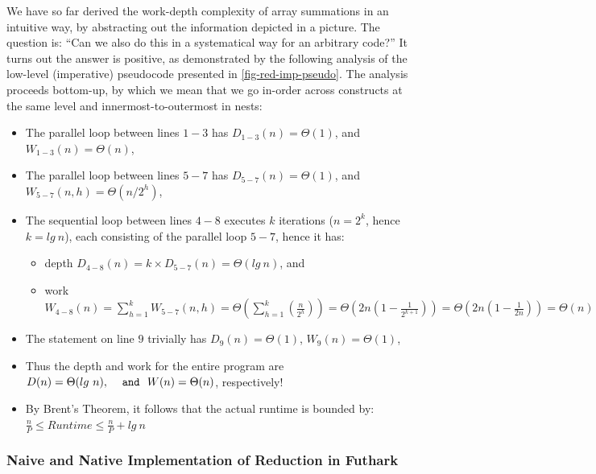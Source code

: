 \documentclass[acmsmall,review]{acmart}\settopmatter{printfolios=true,printccs=false,printacmref=false}
\begin{document}
We have so far derived the work-depth complexity of array summations
in an intuitive way, by abstracting out the information depicted in 
a picture.   The question is: ``Can we also do this in a systematical
way for an arbitrary code?'' It turns out the answer is positive,
as demonstrated by the following analysis of the low-level (imperative)
pseudocode presented in \cref{fig-red-imp-pseudo}. The analysis
proceeds bottom-up, by which we mean that we go in-order across
constructs at the same level and innermost-to-outermost in
nests:

\begin{itemize}
    \item The parallel loop between lines $1-3$ has 
            $D_{1-3}(n) = \Theta(1)$, and $W_{1-3}(n) = \Theta(n)$,
    \item The parallel loop between lines $5-7$ has
            $D_{5-7}(n) = \Theta(1)$, and $W_{5-7}(n,h) = \Theta(n/2^h)$,
    \item The sequential loop between lines $4-8$ executes $k$ 
            iterations ($n = 2^k$, hence $k = lg \ n$), each 
            consisting of the parallel loop $5-7$, 
            hence it has:
        \begin{itemize}
           \item depth $D_{4-8}(n) = k \times D_{5-7}(n) = \Theta(lg \ n)$, and
           \item work $W_{4-8}(n) = \sum_{h=1}^k W_{5-7}(n,h) = \Theta(\sum_{h=1}^k (\frac{n}{2^h}) ) = \Theta(2 n (1 - \frac{1}{2^{k+1}}) ) = \Theta(2 n (1 - \frac{1}{2 n}) ) = \Theta(n)$
        \end{itemize}
    \item The statement on line $9$ trivially has $D_{9}(n) = \Theta(1)$, $W_{9}(n) = \Theta(1)$,\bigskip
    \item Thus the depth and work for the entire program are
        \emph{$D(n) = \Theta(lg \ n), ~~\mbox{\tt and}~~ W(n) = \Theta(n)$}, respectively!
    \item By Brent's Theorem, it follows that the actual runtime is bounded by:
            $\frac{n}{P} \leq Runtime \leq \frac{n}{P} + lg \ n$
\end{itemize}

\subsubsection{Naive and Native Implementation of Reduction in Futhark}
\label{subsubsub:work-depth}
$\mbox{ }$\\
\end{document}
